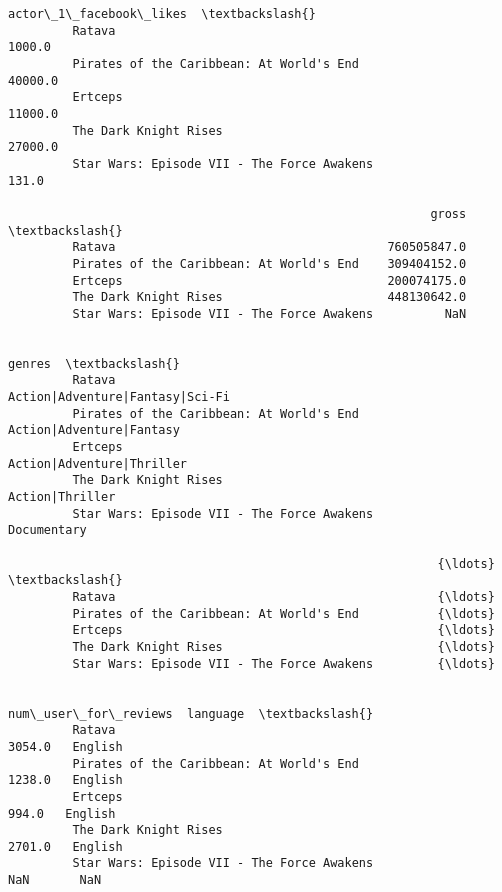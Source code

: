\documentclass[11pt]{article}
\begin{document}
\begin{Verbatim}[commandchars=\\\{\}]
                                                     actor\_1\_facebook\_likes  \textbackslash{}
         Ratava                                                      1000.0   
         Pirates of the Caribbean: At World's End                   40000.0   
         Ertceps                                                    11000.0   
         The Dark Knight Rises                                      27000.0   
         Star Wars: Episode VII - The Force Awakens                   131.0   
         
                                                           gross  \textbackslash{}
         Ratava                                      760505847.0   
         Pirates of the Caribbean: At World's End    309404152.0   
         Ertceps                                     200074175.0   
         The Dark Knight Rises                       448130642.0   
         Star Wars: Episode VII - The Force Awakens          NaN   
         
                                                                              genres  \textbackslash{}
         Ratava                                      Action|Adventure|Fantasy|Sci-Fi   
         Pirates of the Caribbean: At World's End           Action|Adventure|Fantasy   
         Ertceps                                           Action|Adventure|Thriller   
         The Dark Knight Rises                                       Action|Thriller   
         Star Wars: Episode VII - The Force Awakens                      Documentary   
         
                                                            {\ldots}           \textbackslash{}
         Ratava                                             {\ldots}            
         Pirates of the Caribbean: At World's End           {\ldots}            
         Ertceps                                            {\ldots}            
         The Dark Knight Rises                              {\ldots}            
         Star Wars: Episode VII - The Force Awakens         {\ldots}            
         
                                                    num\_user\_for\_reviews  language  \textbackslash{}
         Ratava                                                   3054.0   English   
         Pirates of the Caribbean: At World's End                 1238.0   English   
         Ertceps                                                   994.0   English   
         The Dark Knight Rises                                    2701.0   English   
         Star Wars: Episode VII - The Force Awakens                  NaN       NaN   
         

\end{Verbatim}
\end{document}
